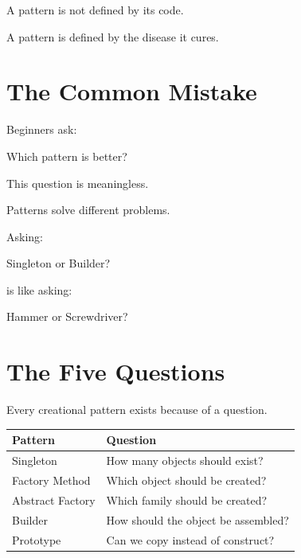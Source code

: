 \documentclass[11pt,a4paper]{book}
\begin{document}
A pattern is not defined by its code.

A pattern is defined by the disease it cures.


\section{The Common Mistake}

\begin{trap}

Beginners ask:

\begin{center}
Which pattern is better?
\end{center}

This question is meaningless.

Patterns solve different problems.

Asking:

\begin{center}
Singleton or Builder?
\end{center}

is like asking:

\begin{center}
Hammer or Screwdriver?
\end{center}

\end{trap}


\section{The Five Questions}

Every creational pattern exists because of a question.

\begin{center}

\begin{tabular}{|p{5cm}|p{7cm}|}
\hline
Pattern & Question \\
\hline
Singleton & How many objects should exist? \\
\hline
Factory Method & Which object should be created? \\
\hline
Abstract Factory & Which family should be created? \\
\hline
Builder & How should the object be assembled? \\
\hline
Prototype & Can we copy instead of construct? \\
\hline
\end{tabular}

\end{center}
\end{document}
